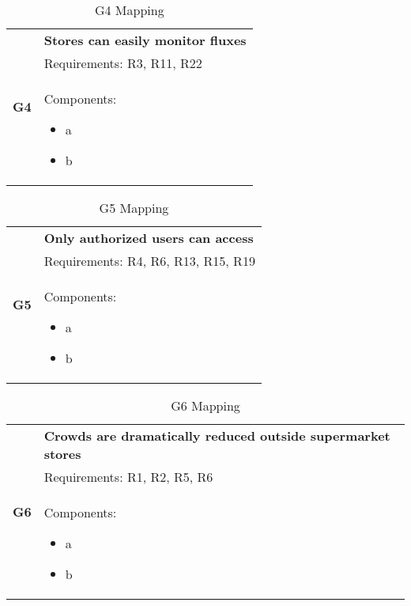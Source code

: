 \begin{table}[H]
	\begin{tabular}{|c|p{14cm}|}
		\hline
		\multirow{3}{*}[-3em]{\textbf{G4}} & \cellcolor{Dandelion} \textbf{Stores can easily monitor fluxes}\\ \cline{2-2}
		& \cellcolor{GreenYellow} Requirements: R3, R11, R22\\ \cline{2-2}
		& \cellcolor{SkyBlue} Components: \begin{itemize}
			\item a
			\item b
		\end{itemize}\\ \hline
	\end{tabular}
	\label{tab:G4Mapping}
	\caption{G4 Mapping}
\end{table}

\begin{table}[H]
	\begin{tabular}{|c|p{14cm}|}
		\hline
		\multirow{3}{*}[-3em]{\textbf{G5}} & \cellcolor{Dandelion} \textbf{Only authorized users can access}\\ \cline{2-2}
		& \cellcolor{GreenYellow} Requirements: R4, R6, R13, R15, R19 \\ \cline{2-2}
		& \cellcolor{SkyBlue} Components: \begin{itemize}
			\item a
			\item b
		\end{itemize}\\ \hline
	\end{tabular}
	\label{tab:G5Mapping}
	\caption{G5 Mapping}
\end{table}

\begin{table}[H]
	\begin{tabular}{|c|p{14cm}|}
		\hline
		\multirow{3}{*}[-3em]{\textbf{G6}} & \cellcolor{Dandelion} \textbf{Crowds are dramatically reduced outside supermarket stores}\\ \cline{2-2}
		& \cellcolor{GreenYellow} Requirements: R1, R2, R5, R6 \\ \cline{2-2}
		& \cellcolor{SkyBlue} Components: \begin{itemize}
			\item a
			\item b
		\end{itemize}\\ \hline
	\end{tabular}
	\label{tab:G6Mapping}
	\caption{G6 Mapping}
\end{table}

